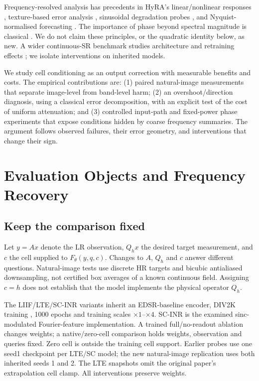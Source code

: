 Frequency-resolved analysis has precedents in HyRA's linear/nonlinear
responses \cite{fsds2024}, texture-based error analysis
\cite{magid2022texture}, sinusoidal degradation probes
\cite{kawai2026frequency}, and Nyquist-normalised forecasting
\cite{wang2026scaleanchoring}. The importance of phase beyond spectral
magnitude is classical \cite{oppenheim1981phase}. We do not claim these
principles, or the quadratic identity below, as new. A wider continuous-SR
benchmark studies architecture and retraining effects
\cite{nasir2026empirical}; we isolate interventions on inherited models.

We study cell conditioning as an output correction with measurable
benefits and costs. The empirical contributions are: (1) paired natural-image
measurements that separate image-level from band-level harm; (2) an
overshoot/direction diagnosis, using a classical error decomposition, with
an explicit test of the cost of uniform attenuation; and (3) controlled
input-path and fixed-power phase experiments that expose conditions hidden
by coarse frequency summaries. The argument follows observed failures,
their error geometry, and interventions that change their sign.

\section{Evaluation Objects and Frequency Recovery}
\label{sec:recovery}
\subsection{Keep the comparison fixed}
Let $y=Ax$ denote the LR observation, $Q_hx$ the desired target measurement,
and $c$ the cell supplied to $F_\theta(y,q,c)$. Changes to $A$, $Q_h$ and
$c$ answer different questions. Natural-image tests use discrete HR targets
and bicubic antialiased downsampling, not certified box averages of a
known continuous field. Assigning $c=h$ does not establish that the model
implements the physical operator $Q_h$.

The LIIF/LTE/SC-INR variants inherit an EDSR-baseline encoder, DIV2K
training \cite{agustsson2017div2k}, 1000 epochs and training scales
$\times1$--$\times4$. SC-INR is the examined sinc-modulated Fourier-feature
implementation. A trained full/no-readout ablation changes weights;
a native/zero-cell comparison holds weights, observation and queries
fixed. Zero cell is outside the training cell support. Earlier probes use
one seed1 checkpoint per LTE/SC model; the new natural-image replication
uses both inherited seeds 1 and 2. The LTE snapshots omit the original
paper's extrapolation cell clamp. All interventions preserve weights.

